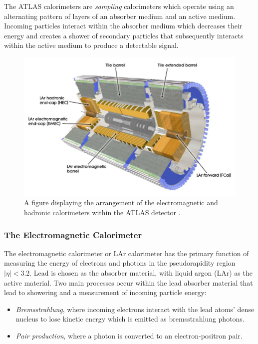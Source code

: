 \documentclass[12pt,a4paper,epsf,portrait,times,epsfig]{report}
\begin{document}
		The ATLAS calorimeters are \textit{sampling} calorimeters which operate using an alternating pattern of layers of an absorber medium and an active medium. Incoming particles interact within the absorber medium which decreases their energy and creates a shower of secondary particles that subsequently interacts within the active medium to produce a detectable signal.  

		\begin{figure}
			\centering
			\includegraphics[scale=0.4]{ATLAS_Calorimeters}
			\caption{A figure displaying the arrangement of the electromagnetic and hadronic calorimeters within the ATLAS detector \cite{AtlasCalImage}.}
			\label{Fig:ATLASCalorimeters} 
		\end{figure} 

		\subsubsection{The Electromagnetic Calorimeter}\label{Section:ECal}

		The electromagnetic calorimeter or LAr calorimeter \cite{ATLASECalTDR} has the primary function of measuring the energy of electrons and photons in the pseudorapidity region $|\eta| < 3.2$. Lead is chosen as the absorber material, with liquid argon (LAr) as the active material. Two main processes occur within the lead absorber material that lead to showering and a measurement of incoming particle energy:
		
		\begin{itemize}
			\item \textit{Bremsstrahlung}, where incoming electrons interact with the lead atoms' dense nucleus to lose kinetic energy which is emitted as bremsstrahlung photons.
			\item \textit{Pair production}, where a photon is converted to an electron-positron pair.
		\end{itemize}
\end{document}
